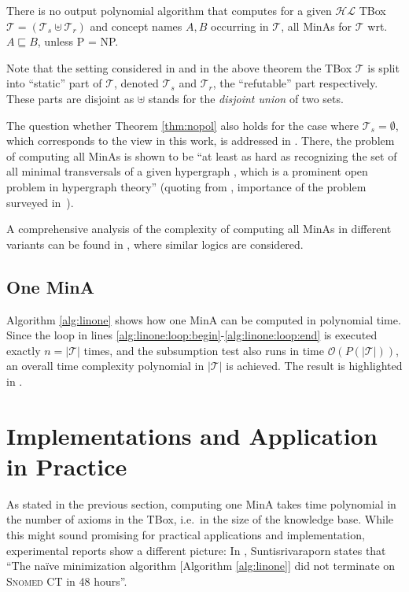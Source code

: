 \documentclass{llncs}
\newcommand{\hl}{\ensuremath{\mathcal{HL}}\xspace}
\newcommand{\tb}{\ensuremath{\mathcal{T}}\xspace} %
\newcommand{\snomed}{\textsc{Snomed CT}\xspace}
\newcommand{\subsume}{\sqsubseteq}
\begin{document}
\begin{theorem}
\label{thm:nopol}
There is no output polynomial algorithm that computes for a given \hl TBox $\tb = (\mathcal{T}_s \uplus \mathcal{T}_r)$ and concept names $A, B$ occurring in $\tb$, all MinAs for $\tb$ wrt.~$A \subsume B$, unless P = NP.
\end{theorem}

Note that the setting considered in \cite{orig1,orig2} and in the above theorem the TBox $\tb$ is split into \enquote{static} part of $\tb$, denoted $\tb_s$ and $\tb_r$, the \enquote{refutable} part respectively. These parts are disjoint as $\uplus$ stands for the \emph{disjoint union} of two sets.

The question whether Theorem \ref{thm:nopol} also holds for the case where $\tb_s = \emptyset$, which corresponds to the view in this work, is addressed in \cite[Thm.~2]{hard}. There, the problem of computing all MinAs is shown to be \enquote{at least as hard as recognizing the set of all minimal transversals of a given hypergraph \cite{hypmintrav}, which is a prominent open problem in hypergraph theory} (quoting from \cite{hard}, importance of the problem surveyed in~\cite{hyperai}).

A comprehensive analysis of the complexity of computing all MinAs in different variants can be found in \cite{family}, where similar logics are considered.

\subsection{One MinA}
\label{sec:one}

Algorithm \ref{alg:linone} shows how one MinA can be computed in polynomial time. Since the loop in lines \ref{alg:linone:loop:begin}-\ref{alg:linone:loop:end} is executed exactly $n = |\tb|$ times, and the subsumption test also runs in time $\mathcal{O}(P(|\tb|))$, an overall time complexity polynomial in $|\tb|$ is achieved. The result is highlighted in \cite[Thm.~6]{orig1,orig2}.

\section{Implementations and Application in Practice}
\label{sec:impl}

As stated in the previous section, computing one MinA takes time polynomial in the number of axioms in the TBox, i.e.~in the size of the knowledge base. While this might sound promising for practical applications and implementation, experimental reports show a different picture: In \cite[Sec.~5.2, p.~97]{meng-phd}, Suntisrivaraporn states that \enquote{The na\"{i}ve minimization algorithm [Algorithm \ref{alg:linone}] did not terminate on \snomed in 48 hours}.
\end{document}

